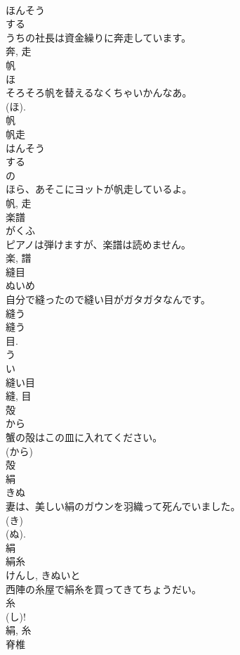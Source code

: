 \documentclass[8pt]{extreport}
\begin{document}
\begin{CJK}{UTF8}{min}
\\	ほんそう	
\\	する 
\\	うちの社長は資金繰りに奔走しています。	
\\	奔, 走	
\\	帆	
\\	ほ	
\\	そろそろ帆を替えるなくちゃいかんなあ。	
\\	(ほ). 
\\	帆	
\\	帆走	
\\	はんそう	
\\	する 
\\	の 
\\	ほら、あそこにヨットが帆走しているよ。	
\\	帆, 走	
\\	楽譜	
\\	がくふ	
\\	ピアノは弾けますが、楽譜は読めません。	
\\	楽, 譜	
\\	縫目	
\\	ぬいめ	
\\	自分で縫ったので縫い目がガタガタなんです。	
\\	縫う 
\\	縫う 
\\	目. 
\\	う 
\\	い 
\\	縫い目 
\\	縫, 目	
\\	殻	
\\	から	
\\	蟹の殻はこの皿に入れてください。	
\\	(から) 
\\	殻	
\\	絹	
\\	きぬ	
\\	妻は、美しい絹のガウンを羽織って死んでいました。	
\\	(き) 
\\	(ぬ). 
\\	絹	
\\	絹糸	
\\	けんし, きぬいと	
\\	西陣の糸屋で絹糸を買ってきてちょうだい。	
\\	糸 
\\	(し)! 
\\	絹, 糸	
\\	脊椎	

\end{CJK}
\end{document}
